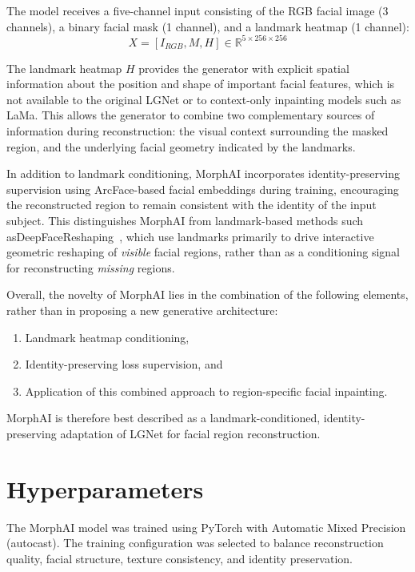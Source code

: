 \noindent The model receives a five-channel input consisting of the RGB facial image (3 channels), 
a binary facial mask (1 channel), and a landmark heatmap (1 channel):
\begin{equation}
    X = [I_{RGB}, M, H] \in \mathbb{R}^{5 \times 256 \times 256}
\end{equation}

\noindent The landmark heatmap $H$ provides the generator with explicit spatial information about the position and shape of important facial features, which is not available to the 
original LGNet or to context-only inpainting models such as LaMa. This allows the 
generator to combine two complementary sources of information during reconstruction: 
the visual context surrounding the masked region, and the underlying facial geometry 
indicated by the landmarks.

\noindent In addition to landmark conditioning, MorphAI incorporates identity-preserving supervision using ArcFace-based facial embeddings during training, encouraging the reconstructed 
region to remain consistent with the identity of the input subject. This distinguishes MorphAI from landmark-based methods such asDeepFaceReshaping~\cite{chen2024deepface}, 
which use landmarks primarily to drive interactive geometric reshaping of \textit{visible} 
facial regions, rather than as a conditioning signal for reconstructing \textit{missing} 
regions.

\noindent Overall, the novelty of MorphAI lies in the combination of the following elements, 
rather than in proposing a new generative architecture:
\begin{enumerate}
    \item Landmark heatmap conditioning,
    \item Identity-preserving loss supervision, and
    \item Application of this combined approach to region-specific facial inpainting.
\end{enumerate}
MorphAI is therefore best described as a landmark-conditioned, identity-preserving 
adaptation of LGNet for facial region reconstruction.


\section{Hyperparameters}

The MorphAI model was trained using PyTorch with Automatic Mixed Precision
(autocast). The training configuration was selected to balance reconstruction
quality, facial structure, texture consistency, and identity preservation.

